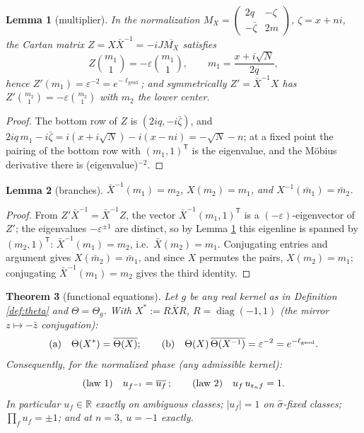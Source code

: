 \documentclass[11pt]{amsart}
\numberwithin{equation}{section}
\theoremstyle{plain}
\newtheorem{theorem}{Theorem}[section]
\newtheorem{lemma}[theorem]{Lemma}
\theoremstyle{definition}
\theoremstyle{remark}
\newcommand{\R}{\mathbb{R}}
\newcommand{\idealr}{\mathfrak{r}}
\begin{document}
\begin{lemma}[multiplier]\label{lem:multiplier}
In the normalization $M_X = \begin{pmatrix} 2q & -\zeta \\ -\bar\zeta
& 2m\end{pmatrix}$, $\zeta = x + ni$, the Cartan matrix
$Z = X\bar X^{-1} = -iJ\overline{M_X}$ satisfies
\[
  Z\binom{m_1}{1} = -\varepsilon\binom{m_1}{1},
  \qquad m_1 = \frac{x + i\sqrt N}{2q},
\]
hence $Z'(m_1) = \varepsilon^{-2} = e^{-\ell_{\mathrm{geod}}}$; and
symmetrically $Z' = \bar X^{-1}X$ has
$Z'\binom{m_2}{1} = -\varepsilon\binom{m_2}{1}$ with $m_2$ the lower
center.
\end{lemma}

\begin{proof}
The bottom row of $Z$ is $(2iq, -i\bar\zeta)$, and
$2iq\,m_1 - i\bar\zeta = i(x + i\sqrt N) - i(x - ni) = -\sqrt N - n$;
at a fixed point the pairing of the bottom row with $(m_1, 1)^{\mathsf
T}$ is the eigenvalue, and the M\"obius derivative there is
(eigenvalue)$^{-2}$.
\end{proof}

\begin{lemma}[branches]\label{lem:branches}
$\bar X^{-1}(m_1) = m_2$, $X(m_2) = m_1$, and
$X^{-1}(\bar m_1) = \bar m_2$.
\end{lemma}

\begin{proof}
From $Z'\bar X^{-1} = \bar X^{-1}Z$, the vector $\bar X^{-1}(m_1,
1)^{\mathsf T}$ is a $(-\varepsilon)$-eigenvector of $Z'$; the
eigenvalues $-\varepsilon^{\pm1}$ are distinct, so by Lemma
\ref{lem:multiplier} this eigenline is spanned by $(m_2, 1)^{\mathsf
T}$: $\bar X^{-1}(m_1) = m_2$, i.e.\ $\bar X(m_2) = m_1$.  Conjugating
entries and argument gives $X(\bar m_2) = \bar m_1$, and since $X$
permutes the pairs, $X(m_2) = m_1$; conjugating $\bar X^{-1}(m_1) =
m_2$ gives the third identity.
\end{proof}

\begin{theorem}[functional equations]\label{thm:funceq}
Let $g$ be any real kernel as in Definition \ref{def:theta} and
$\Theta = \Theta_g$.  With $X^{\ast} := R\bar XR$,
$R = \operatorname{diag}(-1, 1)$ (the mirror $z \mapsto -\bar z$
conjugation):
\[
  \textup{(a)}\quad \Theta(X^{\ast}) = \overline{\Theta(X)};
  \qquad
  \textup{(b)}\quad \Theta(X)\,\overline{\Theta(X^{-1})} =
  \varepsilon^{-2} = e^{-\ell_{\mathrm{geod}}} .
\]
Consequently, for the normalized phase (any admissible kernel):
\[
  \textup{(law 1)}\quad u_{f^{-1}} = \overline{u_f}\,;
  \qquad
  \textup{(law 2)}\quad u_f\,u_{\idealr_nf} = 1 .
\]
In particular $u_f \in \R$ exactly on ambiguous classes;
$|u_f| = 1$ on $\hat\sigma$-fixed classes; $\prod_f u_f = \pm 1$; and
at $n = 3$, $u = -1$ exactly.
\end{theorem}
\end{document}
